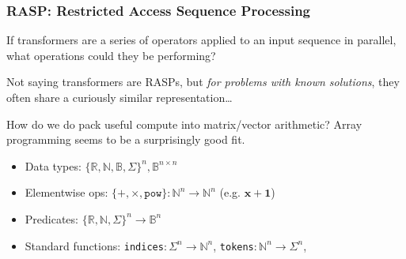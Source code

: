 \documentclass[mathserif,notheorems]{beamer}
\theoremstyle{plain} %
\theoremstyle{definition} %
\begin{document}
  \begin{frame}
    \frametitle{RASP: Restricted Access Sequence Processing}
    If transformers are a series of operators applied to an input sequence in parallel, what operations could they be performing?\linebreak

    Not saying transformers are RASPs, but \textit{for problems with known solutions}, they often share a curiously similar representation\ldots\linebreak

    How do we do pack useful compute into matrix/vector arithmetic? Array programming seems to be a surprisingly good fit.\linebreak

    \begin{itemize}
      \item Data types: $\{\mathbb{R, N, B}, \Sigma\}^n, \mathbb{B}^{n\times n}$
      \item Elementwise ops: $\{+, \times, \texttt{pow}\}: \mathbb{N}^n \rightarrow \mathbb{N}^n$ (e.g. $\mathbf{x} + \mathbf{1}$)
      \item Predicates: $\{\mathbb{R, N}, \Sigma\}^n → \mathbb{B}^n$
      \item Standard functions: \texttt{indices}$:\Sigma^n→\mathbb{N}^n$, \texttt{tokens}$:\mathbb{N}^n→\Sigma^n$,
    \end{itemize}
  \end{frame}
\end{document}
